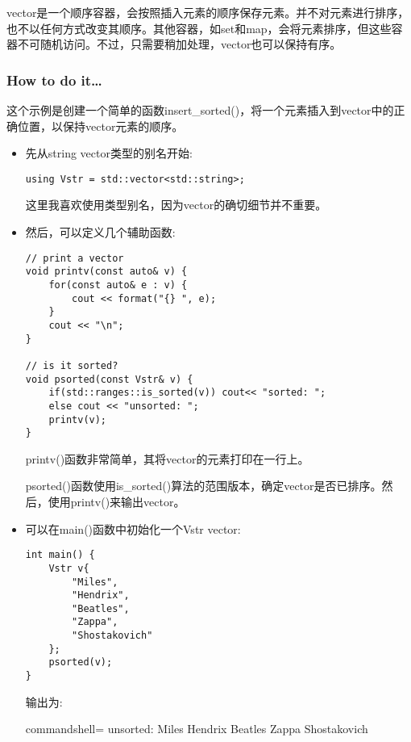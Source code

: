 
vector是一个顺序容器，会按照插入元素的顺序保存元素。并不对元素进行排序，也不以任何方式改变其顺序。其他容器，如set和map，会将元素排序，但这些容器不可随机访问。不过，只需要稍加处理，vector也可以保持有序。

\subsubsection{How to do it…}

这个示例是创建一个简单的函数insert\_sorted()，将一个元素插入到vector中的正确位置，以保持vector元素的顺序。

\begin{itemize}
\item 
先从string vector类型的别名开始:

\begin{lstlisting}[style=styleCXX]
using Vstr = std::vector<std::string>;
\end{lstlisting}

这里我喜欢使用类型别名，因为vector的确切细节并不重要。

\item 
然后，可以定义几个辅助函数:

\begin{lstlisting}[style=styleCXX]
// print a vector
void printv(const auto& v) {
	for(const auto& e : v) {
		cout << format("{} ", e);
	}
	cout << "\n";
}

// is it sorted?
void psorted(const Vstr& v) {
	if(std::ranges::is_sorted(v)) cout<< "sorted: ";
	else cout << "unsorted: ";
	printv(v);
}
\end{lstlisting}

printv()函数非常简单，其将vector的元素打印在一行上。

psorted()函数使用is\_sorted()算法的范围版本，确定vector是否已排序。然后，使用printv()来输出vector。

\item 
可以在main()函数中初始化一个Vstr vector:

\begin{lstlisting}[style=styleCXX]
int main() {
	Vstr v{
		"Miles",
		"Hendrix",
		"Beatles",
		"Zappa",
		"Shostakovich"
	};
	psorted(v);
}
\end{lstlisting}

输出为:

\begin{tcblisting}{commandshell={}}
unsorted: Miles Hendrix Beatles Zappa Shostakovich
\end{tcblisting}


\end{itemize}
